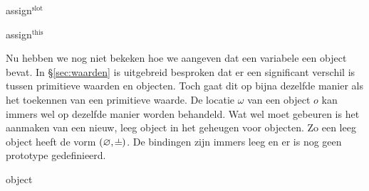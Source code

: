 \begin{NSAxiom}{assign$^\text{slot}$}
  \begin{prooftree}
  \end{prooftree}
  \begin{NSConditions}
  \end{NSConditions}
\end{NSAxiom}

\begin{NSAxiom}{assign$^\text{this}$}
  \begin{prooftree}
  \end{prooftree}
  \begin{NSConditions}
  \end{NSConditions}
\end{NSAxiom}

Nu hebben we nog niet bekeken hoe we aangeven dat een variabele een object bevat. In §\ref{sec:waarden} is uitgebreid besproken dat er een significant verschil is tussen primitieve waarden en objecten. Toch gaat dit op bijna dezelfde manier als het toekennen van een primitieve waarde. De locatie $\omega$ van een object $o$ kan immers wel op dezelfde manier worden behandeld. Wat wel moet gebeuren is het aanmaken van een nieuw, leeg object in het geheugen voor objecten. Zo een leeg object heeft de vorm $(\varnothing, \nil)$. De bindingen zijn immers leeg en er is nog geen prototype gedefinieerd.

\begin{NSAxiom}{object}
  \begin{prooftree}
  \end{prooftree}
  \begin{NSConditions}
  \end{NSConditions}
\end{NSAxiom}

